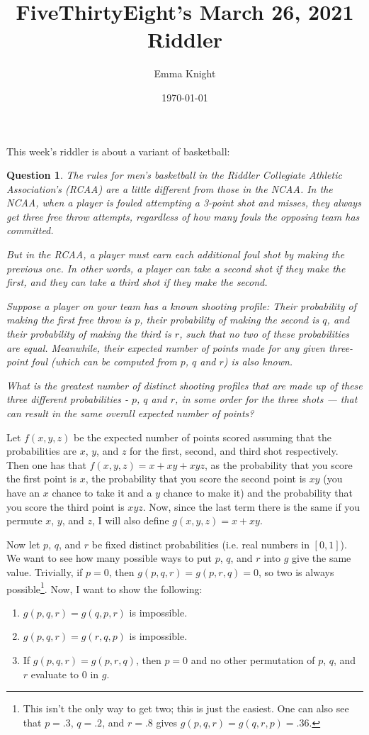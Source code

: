 \documentclass[11pt]{article}
\title{FiveThirtyEight's March 26, 2021 Riddler}
\author{Emma Knight}
\date{\today}
\newtheorem{question}[theorem]{Question}
\theoremstyle{definition}
\begin{document}
\maketitle
This week's riddler is about a variant of basketball:
\begin{question}
The rules for men’s basketball in the Riddler Collegiate Athletic Association’s (RCAA) are a little different from those in the NCAA. In the NCAA, when a player is fouled attempting a 3-point shot and misses, they always get three free throw attempts, regardless of how many fouls the opposing team has committed.

But in the RCAA, a player must earn each additional foul shot by making the previous one. In other words, a player can take a second shot if they make the first, and they can take a third shot if they make the second.

Suppose a player on your team has a known shooting profile: Their probability of making the first free throw is $p$, their probability of making the second is $q$, and their probability of making the third is $r$, such that no two of these probabilities are equal. Meanwhile, their expected number of points made for any given three-point foul (which can be computed from $p$, $q$ and $r$) is also known.

What is the greatest number of distinct shooting profiles that are made up of these three different probabilities - $p$, $q$ and $r$, in some order for the three shots — that can result in the same overall expected number of points?
\end{question}
Let $f(x, y, z)$ be the expected number of points scored assuming that the probabilities are $x$, $y$, and $z$ for the first, second, and third shot respectively.  Then one has that $f(x, y, z) = x + xy + xyz$, as the probability that you score the first point is $x$, the probability that you score the second point is $xy$ (you have an $x$ chance to take it and a $y$ chance to make it) and the probability that you score the third point is $xyz$.  Now, since the last term there is the same if you permute $x$, $y$, and $z$, I will also define $g(x, y, z) = x+xy$.

Now let $p$, $q$, and $r$ be fixed distinct probabilities (i.e. real numbers in $[0, 1]$).  We want to see how many possible ways to put $p$, $q$, and $r$ into $g$ give the same value.  Trivially, if $p =0$, then $g(p, q, r) = g(p, r, q) = 0$, so two is always possible\footnote{This isn't the only way to get two; this is just the easiest.  One can also see that $p = .3$, $q = .2$, and $r = .8$ gives $g(p, q, r) = g(q, r, p) = .36$.}.  Now, I want to show the following:
\begin{enumerate}
\item $g(p, q, r) = g(q, p, r)$ is impossible.
\item $g(p, q, r) = g(r, q, p)$ is impossible.
\item If $g(p, q, r) = g(p, r, q)$, then $p = 0$ and no other permutation of $p$, $q$, and $r$ evaluate to $0$ in $g$.
\end{enumerate}
\end{document}
